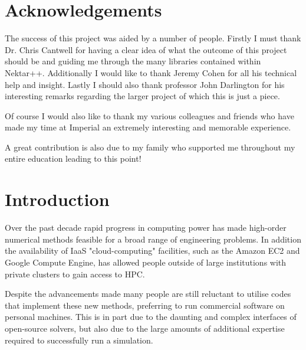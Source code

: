 \documentclass[11pt, a4paper]{report}
\begin{document}
\chapter*{Acknowledgements}
The success of this project was aided by a number of people. Firstly I must thank Dr. Chris Cantwell for having a clear idea of what the outcome of this project should be and guiding me through the many libraries contained within Nektar++. Additionally I would like to thank Jeremy Cohen for all his technical help and insight. Lastly I should also thank professor John Darlington for his interesting remarks regarding the larger project of which this is just a piece.

Of course I would also like to thank my various colleagues and friends who have made my time at Imperial an extremely interesting and memorable experience.

A great contribution is also due to my family who supported me throughout my entire education leading to this point!
\newpage

\newpage
\tableofcontents
\printnomenclature
\newpage
\listoffigures

\listoftables
\newpage
\chapter{Introduction}
Over the past decade rapid progress in computing power has made high-order numerical methods feasible for a broad range of engineering problems. In addition the availability of IaaS "cloud-computing" facilities, such as the Amazon EC2\cite{Amazon_2013} and Google Compute Engine\cite{Google2015}, has allowed people outside of large institutions with private clusters to gain access to HPC.

Despite the advancements made many people are still reluctant to utilise codes that implement these new methods, preferring to run commercial software on personal machines. This is in part due to the daunting and complex interfaces of open-source solvers, but also due to the large amounts of additional expertise required to successfully run a simulation.
\end{document}
